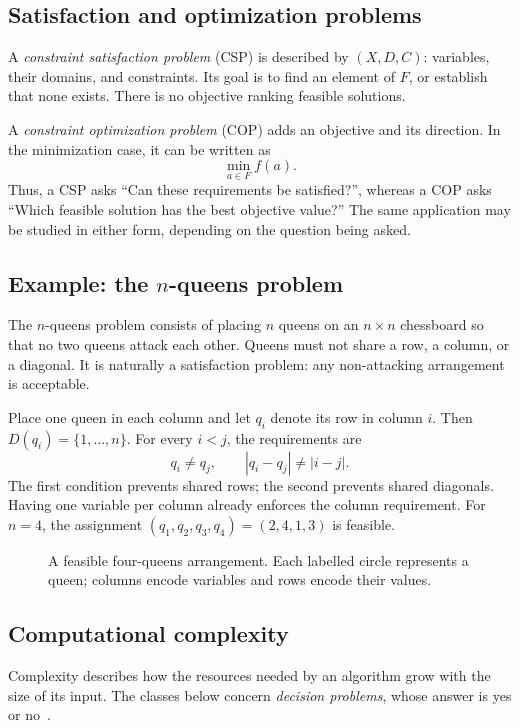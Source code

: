 \subsection{Satisfaction and optimization problems}

A \emph{constraint satisfaction problem} (CSP) is described by $(X,D,C)$:
variables, their domains, and constraints. Its goal is to find an element of
$F$, or establish that none exists. There is no objective ranking feasible
solutions.

A \emph{constraint optimization problem} (COP) adds an objective and its
direction. In the minimization case, it can be written as
\[
 \min_{a\in F} f(a).
\]
Thus, a CSP asks ``Can these requirements be satisfied?'', whereas a COP asks
``Which feasible solution has the best objective value?'' The same application
may be studied in either form, depending on the question being asked.

\subsection{Example: the $n$-queens problem}

The $n$-queens problem consists of placing $n$ queens on an $n\times n$
chessboard so that no two queens attack each other. Queens must not share a
row, a column, or a diagonal. It is naturally a satisfaction problem: any
non-attacking arrangement is acceptable.

Place one queen in each column and let $q_i$ denote its row in column $i$.
Then $D(q_i)=\{1,\ldots,n\}$. For every $i<j$, the requirements are
\[
 q_i\neq q_j,
 \qquad |q_i-q_j|\neq |i-j|.
\]
The first condition prevents shared rows; the second prevents shared diagonals.
Having one variable per column already enforces the column requirement.
For $n=4$, the assignment $(q_1,q_2,q_3,q_4)=(2,4,1,3)$ is feasible.

\begin{figure}[htbp]
 \centering
 
 \caption{A feasible four-queens arrangement. Each labelled circle represents
 a queen; columns encode variables and rows encode their values.}
 \label{fig:nqueens}
\end{figure}

\subsection{Computational complexity}

Complexity describes how the resources needed by an algorithm grow with the
size of its input. The classes below concern \emph{decision problems}, whose
answer is yes or no~\cite{cornell2015complexity}.

